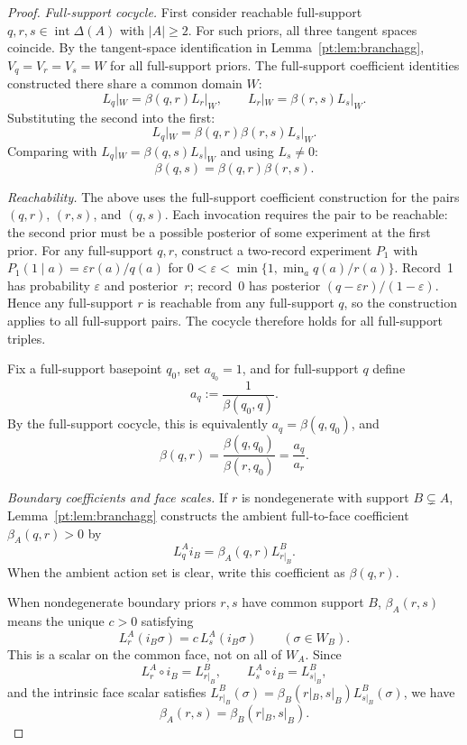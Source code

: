 \documentclass[11pt,a4paper]{article}
\theoremstyle{definition}
\newcommand{\1}{\mathbf 1}
\begin{document}
\begin{proof}

\emph{Full-support cocycle.}  First consider reachable full-support $q,r,s\in\operatorname{int}\Delta(A)$ with $|A|\ge2$.
For such priors, all three tangent spaces coincide.
By the tangent-space identification in Lemma~\ref{pt:lem:branchagg}, $V_q=V_r=V_s=W$ for all full-support priors.
The full-support coefficient identities constructed there share a common domain $W$:
\[
L_q|_W=\beta(q,r)L_r|_W,
\qquad
L_r|_W=\beta(r,s)L_s|_W.
\]
Substituting the second into the first:
\[
L_q|_W=\beta(q,r)\beta(r,s)L_s|_W.
\]
Comparing with $L_q|_W=\beta(q,s)L_s|_W$ and using $L_s\ne 0$:
\[
\beta(q,s)=\beta(q,r)\beta(r,s).
\]

\emph{Reachability.}  The above uses the full-support coefficient construction for the pairs $(q,r)$, $(r,s)$, and
$(q,s)$.  Each invocation requires the pair to be reachable: the second prior must be a possible posterior of some
experiment at the first prior.
For any full-support $q,r$, construct a two-record experiment $P_1$ with $P_1(1\mid a)=\varepsilon r(a)/q(a)$ for
$0<\varepsilon<\min\{1,\min_a q(a)/r(a)\}$.  Record~1 has probability $\varepsilon$ and posterior~$r$; record~0 has posterior
$(q-\varepsilon r)/(1-\varepsilon)$.  Hence any full-support $r$ is reachable from any full-support $q$, so the construction
applies to all full-support pairs.  The cocycle therefore holds for all full-support triples.

Fix a full-support basepoint $q_0$, set $a_{q_0}=1$, and for full-support $q$ define
\[
a_q:=\frac{1}{\beta(q_0,q)}.
\]
By the full-support cocycle, this is equivalently $a_q=\beta(q,q_0)$, and
\[
\beta(q,r)=\frac{\beta(q,q_0)}{\beta(r,q_0)}=\frac{a_q}{a_r}.
\]

\emph{Boundary coefficients and face scales.}  If $r$ is nondegenerate with support $B\subsetneq A$, Lemma~\ref{pt:lem:branchagg}
constructs the ambient full-to-face coefficient $\beta_A(q,r)>0$ by
\[
L_q^A i_B=\beta_A(q,r)L_{r|_B}^B.
\]
When the ambient action set is clear, write this coefficient as $\beta(q,r)$.

When nondegenerate boundary priors $r,s$ have common support $B$, $\beta_A(r,s)$ means the unique $c>0$ satisfying
\[
L_r^A(i_B\sigma)=c\,L_s^A(i_B\sigma)\qquad(\sigma\in W_B).
\]
This is a scalar on the common face, not on all of $W_A$.  Since
\[
L_r^A\circ i_B=L_{r|_B}^B,\qquad L_s^A\circ i_B=L_{s|_B}^B,
\]
and the intrinsic face scalar satisfies
$L_{r|_B}^B(\sigma)=\beta_B(r|_B,s|_B)L_{s|_B}^B(\sigma)$, we have
\[
\beta_A(r,s)=\beta_B(r|_B,s|_B).
\]


\end{proof}
\end{document}

